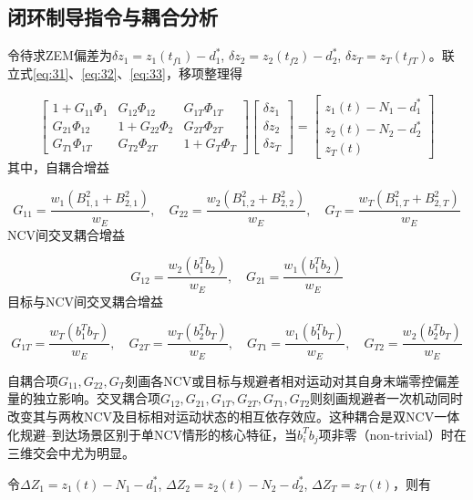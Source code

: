 \subsection{闭环制导指令与耦合分析}
令待求ZEM偏差为${\delta z_1} = {z_1}({t_{f1}}) - d_1^*$, ${\delta z_2} = {z_2}({t_{f2}}) - d_2^*$, ${\delta z_T} = {z_T}({t_{fT}})$。联立式\eqref{eq:31}、\eqref{eq:32}、\eqref{eq:33}，移项整理得

\begin{equation}
\label{eq:38}
\left[ {\begin{array}{*{20}{c}}
  {1 + {G_{11}}{\Phi _1}}&{{G_{12}}{\Phi _{12}}}&{{G_{1T}}{\Phi _{1T}}} \\ 
  {{G_{21}}{\Phi _{12}}}&{1 + {G_{22}}{\Phi _2}}&{{G_{2T}}{\Phi _{2T}}} \\ 
  {{G_{T1}}{\Phi _{1T}}}&{{G_{T2}}{\Phi _{2T}}}&{1 + {G_T}{\Phi _T}} 
\end{array}} \right]
\begin{bmatrix}
  {\delta z_1} \\
  {\delta z_2} \\
  {\delta z_T}
\end{bmatrix}
=
\begin{bmatrix}
  {z_1}(t) - {N_1} - d_1^* \\
  {z_2}(t) - {N_2} - d_2^* \\
  {z_T}(t)
\end{bmatrix}
\end{equation}
其中，自耦合增益

\begin{equation}
\label{eq:39}
{G_{11}} = \frac{{{w_1}(B_{1,1}^2 + B_{2,1}^2)}}{{{w_E}}},\quad {G_{22}} = \frac{{{w_2}(B_{1,2}^2 + B_{2,2}^2)}}{{{w_E}}},\quad {G_T} = \frac{{{w_T}(B_{1,T}^2 + B_{2,T}^2)}}{{{w_E}}}
\end{equation}
NCV间交叉耦合增益

\begin{equation}
\label{eq:40}
{G_{12}} = \frac{{{w_2}(b_1^T{b_2})}}{{{w_E}}},\quad {G_{21}} = \frac{{{w_1}(b_1^T{b_2})}}{{{w_E}}}
\end{equation}
目标与NCV间交叉耦合增益

\begin{equation}
\label{eq:41}
{G_{1T}} = \frac{{{w_T}(b_1^T{b_T})}}{{{w_E}}},\quad {G_{2T}} = \frac{{{w_T}(b_2^T{b_T})}}{{{w_E}}},\quad {G_{T1}} = \frac{{{w_1}(b_1^T{b_T})}}{{{w_E}}},\quad {G_{T2}} = \frac{{{w_2}(b_2^T{b_T})}}{{{w_E}}}
\end{equation}
\begin{remark}
自耦合项${G_{11}},{G_{22}},{G_T}$刻画各NCV或目标与规避者相对运动对其自身末端零控偏差量的独立影响。交叉耦合项${G_{12}},{G_{21}},{G_{1T}},{G_{2T}},{G_{T1}},{G_{T2}}$则刻画规避者一次机动同时改变其与两枚NCV及目标相对运动状态的相互依存效应。这种耦合是双NCV一体化规避–到达场景区别于单NCV情形的核心特征，当$b_i^T{b_j}$项非零（non-trivial）时在三维交会中尤为明显。
\end{remark}
令$\Delta {Z_1} = {z_1}(t) - {N_1} - d_1^*$, $\Delta {Z_2} = {z_2}(t) - {N_2} - d_2^*$, $\Delta {Z_T} = {z_T}(t)$，则有

